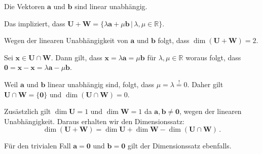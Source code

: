 {\begin{iii}
\item Die Vektoren $\boldsymbol a$ und $\boldsymbol b$ sind linear unabh\"angig.
% 

Das impliziert, dass
$\boldsymbol U + \boldsymbol W
= \{\lambda \boldsymbol a + \mu \boldsymbol b \,|\, \lambda, \mu \in \mathbb{R} \}$.
% 

Wegen der linearen Unabh\"angigkeit von $\boldsymbol a$ und $\boldsymbol b$
folgt, dass
$\dim(\boldsymbol U + \boldsymbol W) = 2$.
% 

Sei $\boldsymbol x \in \boldsymbol U \cap \boldsymbol W$.
Dann gilt, dass  $\boldsymbol x = \lambda \boldsymbol a = \mu \boldsymbol b$
f\"ur $\lambda, \mu \in \mathbb{R}$
woraus folgt, dass
$\boldsymbol 0
= \boldsymbol x - \boldsymbol x
= \lambda \boldsymbol a - \mu \boldsymbol b$.
% 

Weil $\boldsymbol a$ und $\boldsymbol b$ linear unabh\"angig sind, folgt, dass
$\mu = \lambda \stackrel{!}{=} 0$.
% 
Daher gilt
$\boldsymbol U \cap \boldsymbol W = \{ \boldsymbol 0 \}$ und
$\dim(\boldsymbol U \cap \boldsymbol W) = 0$.

Zus\"astzlich gilt 
 $\dim \boldsymbol U = 1$ und $\dim \boldsymbol W = 1$ da
$\boldsymbol a, \boldsymbol b \neq \boldsymbol 0$,
wegen der linearen Unabh\"angigkeit.
% 
% 
Daraus erhalten wir den Dimensionssatz:
$$
\dim (\boldsymbol U + \boldsymbol W)
= \dim \boldsymbol U + \dim \boldsymbol W - \dim (\boldsymbol U \cap \boldsymbol W)\,.
$$

\item F\"ur den trivialen Fall $\boldsymbol a = \boldsymbol 0$ und
$\boldsymbol b = \boldsymbol 0$ gilt der Dimensionssatz ebenfalls.
\end{iii}

}
